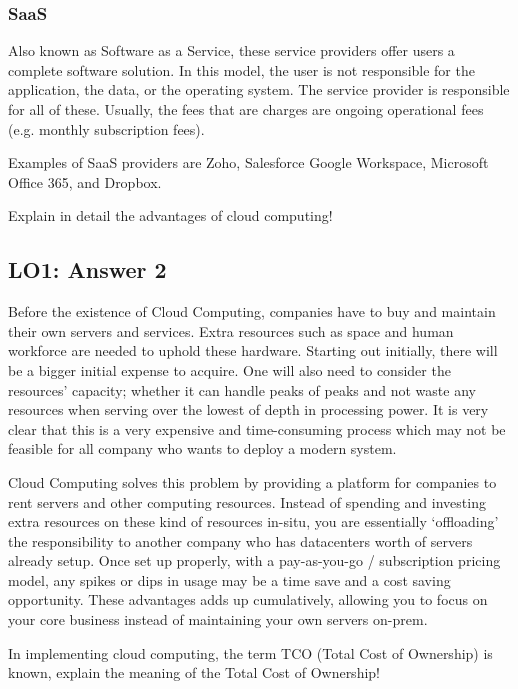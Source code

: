 \documentclass[
  11pt, %
]{assignment}
\begin{document}
\subsubsection*{SaaS} Also known as Software as a Service, these service providers offer users a complete software solution. In this model, the user is not responsible for the application, the data, or the operating system. The service provider is responsible for all of these. Usually, the fees that are charges are ongoing operational fees (e.g\@. monthly subscription fees).

Examples of SaaS providers are Zoho, Salesforce Google Workspace, Microsoft Office 365, and Dropbox.

\begin{problem}
Explain in detail the advantages of cloud computing!
\end{problem}

\subsection*{LO1: Answer 2}

Before the existence of Cloud Computing, companies have to buy and maintain their own servers and services. Extra resources such as space and human workforce are needed to uphold these hardware. Starting out initially, there will be a bigger initial expense to acquire. One will also need to consider the resources' capacity; whether it can handle peaks of peaks and not waste any resources when serving over the lowest of depth in processing power. It is very clear that this is a very expensive and time-consuming process which may not be feasible for all company who wants to deploy a modern system.

Cloud Computing solves this problem by providing a platform for companies to rent servers and other computing resources. Instead of spending and investing extra resources on these kind of resources in-situ, you are essentially `offloading' the responsibility to another company who has datacenters worth of servers already setup. Once set up properly, with a pay-as-you-go / subscription pricing model, any spikes or dips in usage may be a time save and a cost saving opportunity. These advantages adds up cumulatively, allowing you to focus on your core business instead of maintaining your own servers on-prem.

\begin{problem}
In implementing cloud computing, the term TCO (Total Cost of Ownership) is known, explain the meaning of the Total Cost of Ownership!
\end{problem}
\end{document}
